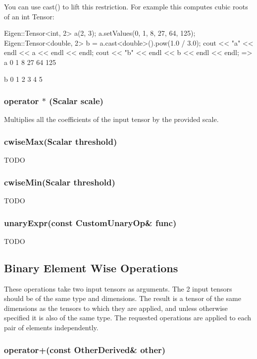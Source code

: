 You can use cast() to lift this restriction. For example this computes cubic roots of an int Tensor\+: \begin{DoxyVerb}Eigen::Tensor<int, 2> a(2, 3);
a.setValues({{0, 1, 8}, {27, 64, 125}});
Eigen::Tensor<double, 2> b = a.cast<double>().pow(1.0 / 3.0);
cout << "a" << endl << a << endl << endl;
cout << "b" << endl << b << endl << endl;
=>
a
0   1   8
27  64 125

b
0 1 2
3 4 5
\end{DoxyVerb}


\subsubsection*{operator $\ast$ (Scalar scale)}

Multiplies all the coefficients of the input tensor by the provided scale.

\subsubsection*{cwise\+Max(\+Scalar threshold)}

T\+O\+DO

\subsubsection*{cwise\+Min(\+Scalar threshold)}

T\+O\+DO

\subsubsection*{unary\+Expr(const Custom\+Unary\+Op\& func)}

T\+O\+DO

\subsection*{Binary Element Wise Operations}

These operations take two input tensors as arguments. The 2 input tensors should be of the same type and dimensions. The result is a tensor of the same dimensions as the tensors to which they are applied, and unless otherwise specified it is also of the same type. The requested operations are applied to each pair of elements independently.

\subsubsection*{operator+(const Other\+Derived\& other)}

